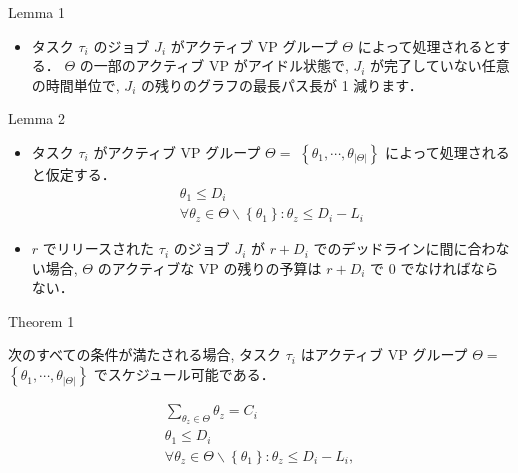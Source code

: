 \begin{frame}[label=lemma1]{Lemma 1}
    \begin{lemma}[]
        \begin{itemize}
            \item タスク $\tau_{i}$ のジョブ $J_{i}$ がアクティブ VP グループ $\Theta$ によって処理されるとする． $\Theta$ の一部のアクティブ VP がアイドル状態で, $J_{i}$ が完了していない任意の時間単位で,  $J_{i}$ の残りのグラフの最長パス長が 1 減ります．
        \end{itemize}
    \end{lemma}
\end{frame}

\begin{frame}[label=lemma2]{Lemma 2}
    \begin{lemma}[]
        \begin{itemize}
            \item タスク $\tau_{i}$ がアクティブ VP グループ $\Theta=$  $\left\{\theta_{1}, \cdots, \theta_{|\Theta|}\right\}$ によって処理されると仮定する．
                  \begin{equation*}
                      \begin{gathered}
                          \theta_{1} \leq D_{i} \\
                          \forall \theta_{z} \in \Theta \backslash\left\{\theta_{1}\right\}: \theta_{z} \leq D_{i}-L_{i}
                      \end{gathered}
                  \end{equation*}
            \item $r$ でリリースされた $\tau_{i}$ のジョブ $J_{i}$ が $r+D_{i}$ でのデッドラインに間に合わない場合, $\Theta$ のアクティブな VP の残りの予算は $r+D_{i}$ で 0 でなければならない．
        \end{itemize}
    \end{lemma}
\end{frame}

\begin{frame}[label=theorem1]{Theorem 1}
    \begin{theorem}[]
        次のすべての条件が満たされる場合, タスク $\tau_{i}$ はアクティブ VP グループ $\Theta=$  $\left\{\theta_{1}, \cdots, \theta_{|\Theta|}\right\}$ でスケジュール可能である．

        \begin{equation*}
            \begin{gathered}
                \sum_{\theta_{z} \in \Theta} \theta_{z}=C_{i} \\
                \theta_{1} \leq D_{i} \\
                \forall \theta_{z} \in \Theta \backslash\left\{\theta_{1}\right\}: \theta_{z} \leq D_{i}-L_{i},
            \end{gathered}
        \end{equation*}
    \end{theorem}
\end{frame}
